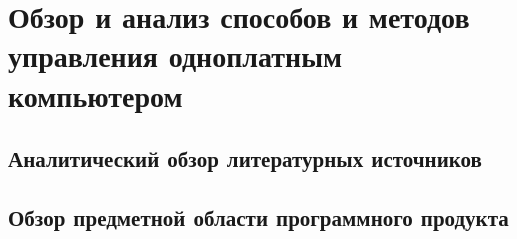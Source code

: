 \section{Обзор и анализ способов и методов управления одноплатным компьютером}

\subsection{Аналитический обзор литературных источников}

\subsection{Обзор предметной области программного продукта}

\newpage
